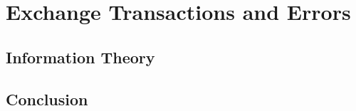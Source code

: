 \section{Exchange Transactions and Errors}
\label{section:exchange_transactions_and_errors}

% 
% 

\subsection{Information Theory}


\subsection{Conclusion}

